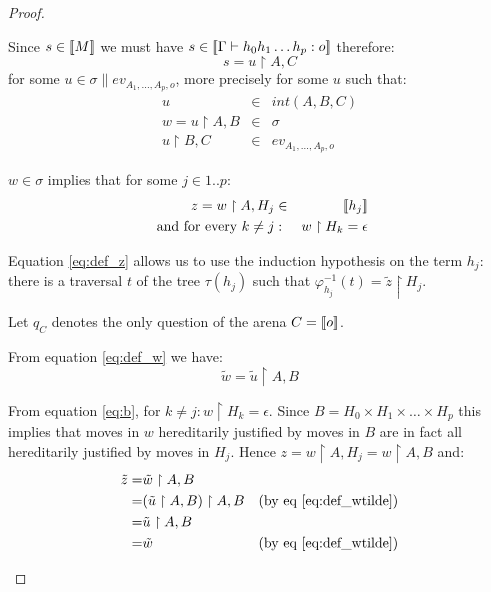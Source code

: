 \begin{proof}
\begin{itemize}
        Since $s \in {[\![M ]\!]}$ we must have $s\in {[\![\Gamma \vdash h_0 h_1 \ldots h_p : o ]\!]}$ therefore:
        \begin{equation}
            s = u \upharpoonright A, C \label{eq:def_s}
        \end{equation}
        for some $u \in \sigma \parallel ev_{A_1,\ldots,A_p,o}$, more precisely for some $u$ such that:
        \begin{eqnarray}
          u &\in& int(A,B,C) \nonumber \\
          w = u \upharpoonright A,B & \in& \sigma       \label{eq:def_w}\\
          u \upharpoonright B,C & \in & ev_{A_1,\ldots,A_p,o} \nonumber
        \end{eqnarray}

        $w \in \sigma$ implies that for some $j \in 1..p$:
        \begin{eqnarray}
          z = w \upharpoonright A, H_j &\in& {[\![ h_j ]\!]}  \label{eq:def_z} \\
          \mbox{ and for every } k\neq j &:& w \upharpoonright H_k = \epsilon \label{eq:b}
        \end{eqnarray}

        Equation \ref{eq:def_z} allows us to use the induction hypothesis on the term $h_j$:
        there is a traversal $t$ of the tree $\tau(h_j)$ such that $\varphi^{-1}_{h_j}(t) = \tilde{z} \upharpoonright H_j$.

        Let $q_C$ denotes the only question of the arena $C = {[\![ o ]\!]}$.


        From equation \ref{eq:def_w} we have:
        \begin{equation}
         \tilde{w} = \tilde{u} \upharpoonright A,B
         \label{eq:def_wtilde}
        \end{equation}

        From equation \ref{eq:b}, for $k\neq j : w \upharpoonright H_k = \epsilon$. Since $B =
        H_0 \times H_1 \times \ldots \times H_p$ this implies that moves in $w$ hereditarily justified by moves in $B$ are in fact all
        hereditarily justified by moves in $H_j$.  Hence $z = w \upharpoonright A, H_j = w \upharpoonright A, B$ and:
        \begin{eqnarray*}
             \tilde{z} =& \tilde{w} \upharpoonright A,B \\
              =& (\tilde{u} \upharpoonright A,B) \upharpoonright A,B &\mbox{(by eq \ref{eq:def_wtilde})} \\
              =& \tilde{u} \upharpoonright A,B \\
              =& \tilde{w}  & \mbox{(by eq \ref{eq:def_wtilde})}
        \end{eqnarray*}



\end{itemize}
\end{proof}
